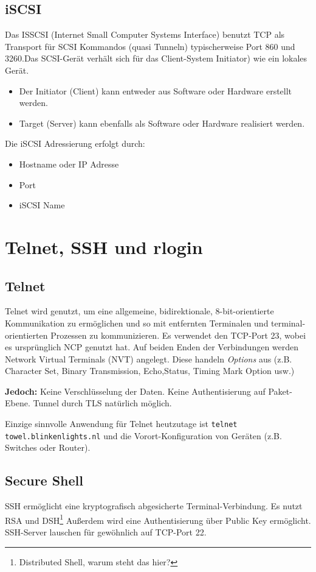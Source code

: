 \documentclass{article} %
\begin{document}
\subsection{iSCSI}
Das ISSCSI (Internet Small Computer Systems Interface) benutzt TCP als Transport für SCSI Kommandos (quasi Tunneln)  typischerweise Port 860 und 3260.Das SCSI-Gerät verhält sich für das Client-System Initiator) wie ein lokales Gerät.
	\begin{itemize}
	\item Der Initiator (Client) kann entweder aus Software oder Hardware erstellt werden. 
	\item Target (Server) kann ebenfalls als Software oder Hardware realisiert werden. 
	\end{itemize}
Die iSCSI Adressierung erfolgt durch:
	\begin{itemize}
	\item Hostname oder IP Adresse 
	\item Port 
	\item iSCSI Name
	\end{itemize}


\section{Telnet, SSH und rlogin}
\subsection{Telnet}
Telnet wird genutzt, um eine allgemeine, bidirektionale, 8-bit-orientierte Kommunikation zu ermöglichen und so mit entfernten Terminalen und terminal-orientierten Prozessen zu kommunizieren.
Es verwendet den TCP-Port 23, wobei es ursprünglich NCP genutzt hat.
Auf beiden Enden der Verbindungen werden Network Virtual Terminals (NVT) angelegt.
Diese handeln \emph{Options} aus (z.B. Character Set, Binary Transmission, Echo,Status, Timing Mark Option usw.)

\textbf{Jedoch: } Keine Verschlüsselung der Daten. Keine Authentisierung
auf Paket-Ebene. Tunnel durch TLS natürlich möglich.

Einzige sinnvolle Anwendung für Telnet heutzutage ist \texttt{telnet towel.blinkenlights.nl} und die Vorort-Konfiguration von Geräten (z.B. Switches oder Router).
\subsection{Secure Shell}
SSH\cite{rfc4251} ermöglicht eine kryptografisch abgesicherte Terminal-Verbindung.
Es nutzt RSA und DSH\footnote{Distributed Shell, warum steht das hier?}
Außerdem wird eine Authentisierung über Public Key ermöglicht.
SSH-Server lauschen für gewöhnlich auf TCP-Port 22.
\end{document}

